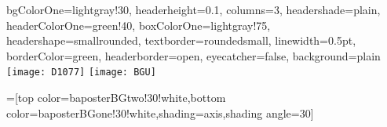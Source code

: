 \documentclass[portrait,final,a0paper]{baposter}
\begin{document}
\begin{poster}%
  {
  bgColorOne=lightgray!30,
  headerheight=0.1\textheight,
  columns=3,
  headershade=plain,
  headerColorOne=green!40,
  boxColorOne=lightgray!75,
  headershape=smallrounded,
  textborder=roundedsmall,
  linewidth=0.5pt,
  borderColor=green,
  headerborder=open,
  eyecatcher=false,
  background=plain
}
  {\texttt{[image: D1077]}} %
  {\bf \vspace{1em}}
  {\sf
  \vspace{-1.2em}  {}
  }
  {\hspace{1em}\texttt{[image: BGU]}\
  }

  =[top color=baposterBGtwo!30!white,bottom color=baposterBGone!30!white,shading=axis,shading angle=30]


\end{poster}
\end{document}

